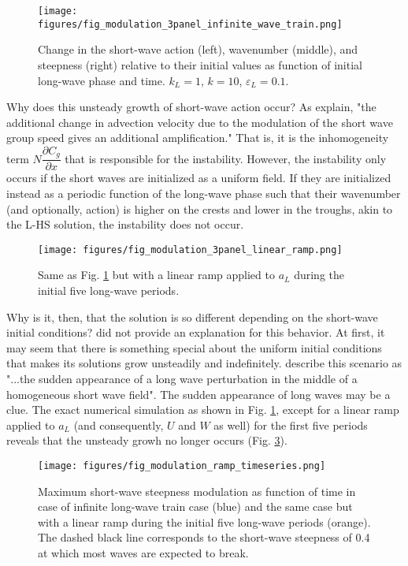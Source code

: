 \documentclass[draft]{agujournal2019}
\begin{document}
\begin{figure}[h]
\label{fig:modulation_3panel_infinite}
\centering
\texttt{[image: figures/fig\_modulation\_3panel\_infinite\_wave\_train.png]}
\caption{
  Change in the short-wave action (left), wavenumber (middle), and steepness (right)
  relative to their initial values as function of initial long-wave phase and time.
  $k_L = 1$, $k = 10$, $\varepsilon_L = 0.1$.
}
\end{figure}

Why does this unsteady growth of short-wave action occur?
As  explain, "the additional change in advection
velocity due to the modulation of the short wave group speed gives an additional
amplification."
That is, it is the inhomogeneity term $N \dfrac{\partial C_g}{\partial x}$ that
is responsible for the instability.
However, the instability only occurs if the short waves are initialized as a
uniform field.
If they are initialized instead as a periodic function of the long-wave phase
such that their wavenumber (and optionally, action) is higher on the crests
and lower in the troughs, akin to the L-HS solution, the instability does not
occur.

\begin{figure}[h]
\label{fig:modulation_3panel_ramp}
\centering
\texttt{[image: figures/fig\_modulation\_3panel\_linear\_ramp.png]}
\caption{
  Same as Fig. \ref{fig:modulation_3panel_infinite} but with a linear ramp
  applied to $a_L$ during the initial five long-wave periods.
}
\end{figure}

Why is it, then, that the solution is so different depending on the short-wave
initial conditions?
 did not provide an explanation for this behavior.
At first, it may seem that there is something special about the uniform initial
conditions that makes its solutions grow unsteadily and indefinitely.
 describe this scenario as "...the sudden appearance
of a long wave perturbation in the middle of a homogeneous short wave field".
The sudden appearance of long waves may be a clue.
The exact numerical simulation as shown in Fig. \ref{fig:modulation_3panel_infinite},
except for a linear ramp applied to $a_L$ (and consequently, $U$ and $W$ as well)
for the first five periods reveals that the unsteady growh no longer occurs
(Fig. \ref{fig:modulation_3panel_ramp}).

\begin{figure}[h]
  \label{fig:modulation_3panel_ramp}
  \centering
  \texttt{[image: figures/fig\_modulation\_ramp\_timeseries.png]}
  \caption{
    Maximum short-wave steepness modulation as function of time in case of
    infinite long-wave train case (blue) and the same case but with a linear
    ramp during the initial five long-wave periods (orange). The dashed black
    line corresponds to the short-wave steepness of 0.4 at which most waves are
    expected to break.
  }
  \end{figure}
\end{document}
